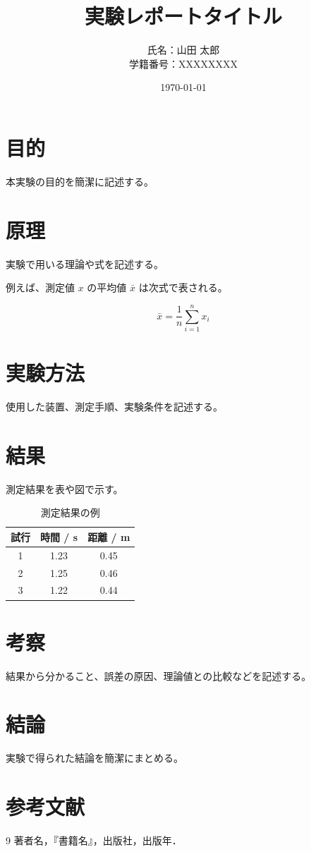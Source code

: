 \documentclass[a4paper,11pt]{ltjsarticle}
\title{実験レポートタイトル}
\author{氏名：山田 太郎 \\ 学籍番号：XXXXXXXX}
\date{\today}
\begin{document}
\maketitle

\section{目的}

本実験の目的を簡潔に記述する。

\section{原理}

実験で用いる理論や式を記述する。

例えば、測定値 $x$ の平均値 $\bar{x}$ は次式で表される。

\begin{equation}
  \bar{x} = \frac{1}{n}\sum_{i=1}^{n} x_i
\end{equation}

\section{実験方法}

使用した装置、測定手順、実験条件を記述する。

\section{結果}

測定結果を表や図で示す。

\begin{table}[htbp]
  \centering
  \caption{測定結果の例}
  \label{tab:result}
  \begin{tabular}{ccc}
    \toprule
    試行 & 時間 / \si{\second} & 距離 / \si{\meter} \\
    \midrule
    1 & 1.23 & 0.45 \\
    2 & 1.25 & 0.46 \\
    3 & 1.22 & 0.44 \\
    \bottomrule
  \end{tabular}
\end{table}

\section{考察}

結果から分かること、誤差の原因、理論値との比較などを記述する。

\section{結論}

実験で得られた結論を簡潔にまとめる。

\section{参考文献}

\begin{thebibliography}{9}
  著者名，『書籍名』，出版社，出版年．
\end{thebibliography}
\end{document}

